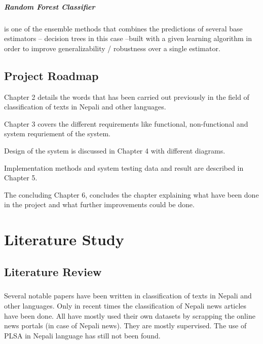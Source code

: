 \documentclass[12pt]{report}
\begin{document}
        \paragraph{Random Forest Classifier}
        
        is one of the ensemble methods that combines the predictions of several base estimators -- decision trees in this case --built with a given learning algorithm 
        in order to improve generalizability / robustness over a single estimator.  


        \section{Project Roadmap}
        Chapter 2 details the words that has been carried out previously in the field of classification of texts in Nepali and other languages. 
        
        Chapter 3 covers the different requirements like functional, non-functional and system requriement of the system.

        Design of the system is discussed in Chapter 4 with different diagrams.

        Implementation methods and system testing data and result are described in Chapter 5.

        The concluding Chapter 6, concludes the chapter explaining what have been done in the project and what further improvements could be done.





    \chapter{Literature Study}
    
            \section{Literature Review}
                \paragraph{}
                    Several notable papers have been written in classification of texts in Nepali and other languages. Only in recent times the classification of Nepali news articles have been done.
                    All have mostly used their own datasets by scrapping the online news portals (in case of Nepali news). They are mostly supervised. The use of PLSA in Nepali language has still not been found.
                    
\end{document}

